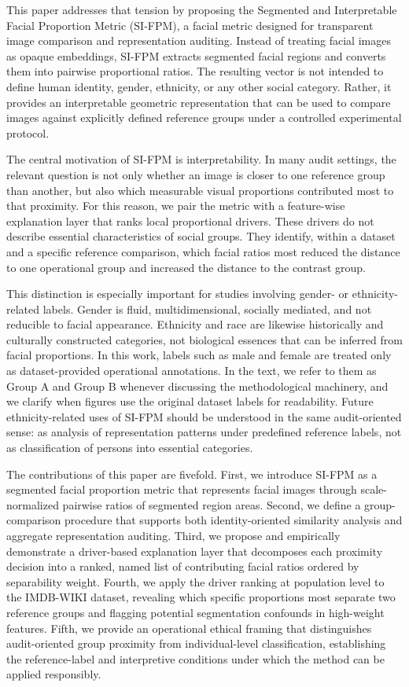 \documentclass{article}
\begin{document}
This paper addresses that tension by proposing the Segmented and Interpretable Facial Proportion Metric (SI-FPM), a facial metric designed for transparent image comparison and representation auditing. Instead of treating facial images as opaque embeddings, SI-FPM extracts segmented facial regions and converts them into pairwise proportional ratios. The resulting vector is not intended to define human identity, gender, ethnicity, or any other social category. Rather, it provides an interpretable geometric representation that can be used to compare images against explicitly defined reference groups under a controlled experimental protocol.

The central motivation of SI-FPM is interpretability. In many audit settings, the relevant question is not only whether an image is closer to one reference group than another, but also which measurable visual proportions contributed most to that proximity. For this reason, we pair the metric with a feature-wise explanation layer that ranks local proportional drivers. These drivers do not describe essential characteristics of social groups. They identify, within a dataset and a specific reference comparison, which facial ratios most reduced the distance to one operational group and increased the distance to the contrast group.

This distinction is especially important for studies involving gender- or ethnicity-related labels. Gender is fluid, multidimensional, socially mediated, and not reducible to facial appearance. Ethnicity and race are likewise historically and culturally constructed categories, not biological essences that can be inferred from facial proportions. In this work, labels such as male and female are treated only as dataset-provided operational annotations. In the text, we refer to them as Group A and Group B whenever discussing the methodological machinery, and we clarify when figures use the original dataset labels for readability. Future ethnicity-related uses of SI-FPM should be understood in the same audit-oriented sense: as analysis of representation patterns under predefined reference labels, not as classification of persons into essential categories.

The contributions of this paper are fivefold. First, we introduce SI-FPM as a segmented facial proportion metric that represents facial images through scale-normalized pairwise ratios of segmented region areas. Second, we define a group-comparison procedure that supports both identity-oriented similarity analysis and aggregate representation auditing. Third, we propose and empirically demonstrate a driver-based explanation layer that decomposes each proximity decision into a ranked, named list of contributing facial ratios ordered by separability weight. Fourth, we apply the driver ranking at population level to the IMDB-WIKI dataset, revealing which specific proportions most separate two reference groups and flagging potential segmentation confounds in high-weight features. Fifth, we provide an operational ethical framing that distinguishes audit-oriented group proximity from individual-level classification, establishing the reference-label and interpretive conditions under which the method can be applied responsibly.
\end{document}
